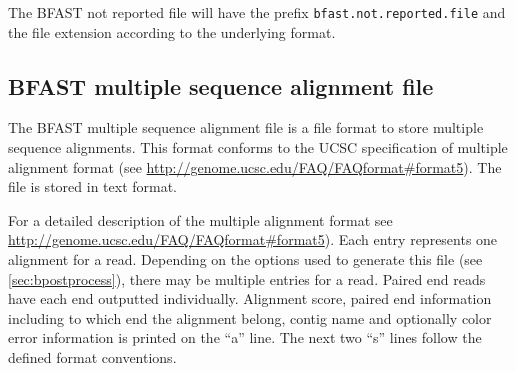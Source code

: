 \documentclass[a4paper,12pt]{book}
\newcommand{\TT}[1]{{\tt #1}} %
\newcommand{\QU}[1]{``#1''} %
\newcommand{\BNRF}{BFAST not reported file} %
\newcommand{\BMAF}{BFAST multiple sequence alignment file} %
\begin{document}
The \BNRF{} will have the prefix \TT{bfast.not.reported.file} and the file extension according to the underlying format.

\subsection{\BMAF{}}
\label{sec:bmaf}
The \BMAF{} is a file format to store multiple sequence alignments.
This format conforms to the UCSC specification of  multiple alignment format (see \url{http://genome.ucsc.edu/FAQ/FAQformat#format5}).
The file is stored in text format.

For a detailed description of the multiple alignment format see \url{http://genome.ucsc.edu/FAQ/FAQformat#format5}).
Each entry represents one alignment for a read. 
Depending on the options used to generate this file (see \autoref{sec:bpostprocess}), there may be multiple entries for a read.
Paired end reads have each end outputted individually.
Alignment score, paired end information including to which end the alignment belong, contig name and optionally color error information is printed on the \QU{a} line.
The next two \QU{s} lines follow the defined format conventions.
\end{document}

